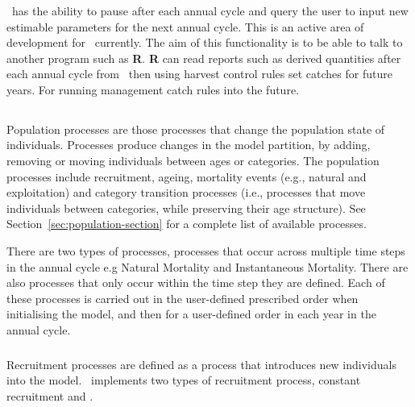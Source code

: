 \subsubsection{\label{sec:singlestepping}}

\CNAME\ has the ability to pause after each annual cycle and query the user to input new estimable parameters for the next annual cycle. This is an active area of development for \CNAME\ currently. The aim of this functionality is to be able to talk to another program such as \textbf{R}. \textbf{R} can read reports such as derived quantities after each annual cycle from \CNAME\ then using harvest control rules set catches for future years. For running management catch rules into the future.



\subsection{}
Population processes are those processes that change the population state of individuals. Processes produce changes in the model partition, by adding, removing or moving individuals between ages or categories. The population processes include recruitment, ageing,  mortality events (e.g., natural and exploitation) and category transition processes (i.e., processes that move individuals between categories, while preserving their age structure). See Section~\ref{sec:population-section} for a complete list of available processes.

There are two types of processes, processes that occur across multiple time steps in the annual cycle e.g Natural Mortality and Instantaneous Mortality. There are also processes that only occur within the time step they are defined. Each of these processes is carried out in the user-defined prescribed order when initialising the model, and then for a user-defined order in each year in the annual cycle. 

\subsubsection{}
Recruitment processes are defined as a process that introduces new individuals into the model. \CNAME\ implements two types of recruitment process, constant recruitment and   \citep{1203}.

